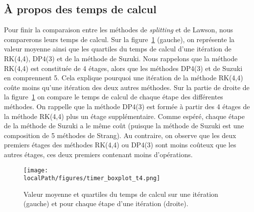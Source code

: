 
\subsection{À propos des temps de calcul}
\label{ssec:2:time}

Pour finir la comparaison entre les méthodes de \emph{splitting} et de Lawson, nous comparerons leurs temps de calcul. Sur la figure~\ref{fig:timer_boxplot_t4} (gauche), on représente la valeur moyenne ainsi que les quartiles du temps de calcul d'une itération de RK(4,4), DP4(3) et de la méthode de Suzuki. Nous rappelons que la méthode RK(4,4) est constituée de 4 étages, alors que les méthodes DP4(3) et de Suzuki en comprennent 5. Cela explique pourquoi une itération de la méthode RK(4,4) coûte moins qu'une itération des deux autres méthodes. Sur la partie de droite de la figure~\ref{fig:timer_boxplot_t4} on compare le temps de calcul de chaque étape des différentes méthodes. On rappelle que la méthode DP4(3) est formée à partir des 4 étages de la méthode RK(4,4) plus un étage supplémentaire. Comme espéré, chaque étape de la méthode de Suzuki a le même coût (puisque la méthode de Suzuki est une composition de 5 méthodes de Strang). Au contraire, on observe que les deux premiers étages des méthodes RK(4,4) ou DP4(3) sont moins coûteux que les autres étages, ces deux premiers contenant moins d'opérations.

\begin{figure}[h]
  \centering
  \texttt{[image: \\localPath/figures/timer\_boxplot\_t4.png]}
  \caption{Valeur moyenne et quartiles du temps de calcul sur une itération (gauche) et pour chaque étape d'une itération (droite).}
  \label{fig:timer_boxplot_t4}
\end{figure}
